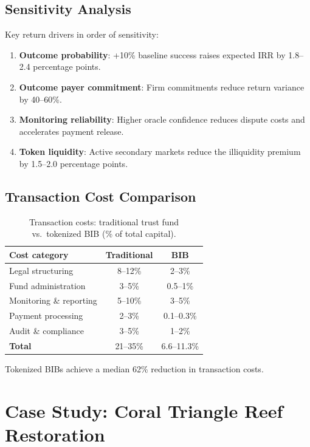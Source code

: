 \documentclass[11pt,a4paper]{article}
\begin{document}
\subsection{Sensitivity Analysis}

Key return drivers in order of sensitivity:
\begin{enumerate}
  \item \textbf{Outcome probability}: +10\% baseline success raises
    expected IRR by 1.8--2.4 percentage points.
  \item \textbf{Outcome payer commitment}: Firm commitments reduce
    return variance by 40--60\%.
  \item \textbf{Monitoring reliability}: Higher oracle confidence
    reduces dispute costs and accelerates payment release.
  \item \textbf{Token liquidity}: Active secondary markets reduce the
    illiquidity premium by 1.5--2.0 percentage points.
\end{enumerate}

\subsection{Transaction Cost Comparison}

\begin{table}[H]
\centering
\caption{Transaction costs: traditional trust fund vs.\ tokenized BIB
(\% of total capital).}
\label{tab:costs}
\begin{tabular}{lcc}
\toprule
\textbf{Cost category} & \textbf{Traditional} & \textbf{BIB} \\
\midrule
Legal structuring      & 8--12\%  & 2--3\% \\
Fund administration    & 3--5\%   & 0.5--1\% \\
Monitoring \& reporting & 5--10\% & 3--5\% \\
Payment processing     & 2--3\%   & 0.1--0.3\% \\
Audit \& compliance    & 3--5\%   & 1--2\% \\
\midrule
\textbf{Total}         & 21--35\% & 6.6--11.3\% \\
\bottomrule
\end{tabular}
\end{table}

Tokenized BIBs achieve a median 62\% reduction in transaction costs.


\section{Case Study: Coral Triangle Reef Restoration}
\label{sec:case_study}
\end{document}
